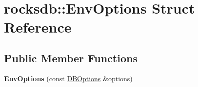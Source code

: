 \hypertarget{structrocksdb_1_1EnvOptions}{}\section{rocksdb\+:\+:Env\+Options Struct Reference}
\label{structrocksdb_1_1EnvOptions}
\subsection*{Public Member Functions}
\begin{DoxyCompactItemize}
\item 
{\bfseries Env\+Options} (const \hyperlink{structrocksdb_1_1DBOptions}{D\+B\+Options} \&options)\hypertarget{structrocksdb_1_1EnvOptions_a65453c22ddd76dc888089322c52581ce}{}\label{structrocksdb_1_1EnvOptions_a65453c22ddd76dc888089322c52581ce}

\end{DoxyCompactItemize}
